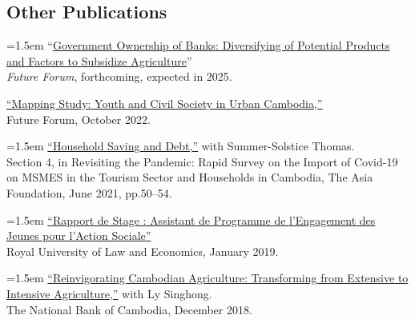 \documentclass[10pt,a4paper]{article}
\begin{document}
\subsection*{Other Publications}

	\hangindent=1.5em
	“\href{https://kosalnith.github.io/research/papers/GOB.pdf}{Government Ownership of Banks: Diversifying of Potential Products and Factors to Subsidize Agriculture}” \\
	\textit{Future Forum}, forthcoming, expected in 2025. \\ \vspace{-.5em} 
	
	\href{}{``Mapping Study: Youth and Civil Society in Urban Cambodia,”} \\
	Future Forum, October 2022.\\ \vspace{-.5em} 
	
	\hangindent=1.5em
	\href{https://kosalnith.github.io/research/policies/COVID-19-HHSavingsDebt.pdf}{``Household Saving and Debt,”} with Summer-Solstice Thomas.\\
	Section 4, in Revisiting the Pandemic: Rapid Survey on the Import of Covid-19 on MSMES in the Tourism Sector and Households in Cambodia, The Asia Foundation, June 2021, pp.50--54.\\ \vspace{-.5em} 
			
	\hangindent=1.5em
	\href{https://www.researchgate.net/publication/330936932_Rapport_du_Stage_Assistant_de_Programme_a_l%27YRDP}{``Rapport de Stage : Assistant de Programme de l'Engagement des Jeunes pour l'Action Sociale”} \\
	Royal University of Law and Economics, January 2019. \\ \vspace{-.5em}
			
	\hangindent=1.5em
	\href{https://ideas.repec.org/p/pra/mprapa/93086.html}{``Reinvigorating Cambodian Agriculture: Transforming from Extensive to Intensive Agriculture,”} with Ly Singhong. \\
	The National Bank of Cambodia, December 2018. 
\end{document}
